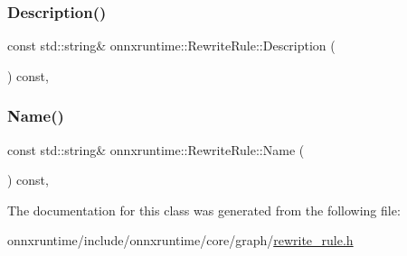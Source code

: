 \mbox{\label{classonnxruntime_1_1RewriteRule_aafea189c5808aa548e21b59650406357}} 
\subsubsection{\texorpdfstring{Description()}{Description()}}
{\footnotesize\ttfamily const std\+::string\& onnxruntime\+::\+Rewrite\+Rule\+::\+Description (\begin{DoxyParamCaption}{ }\end{DoxyParamCaption}) const\hspace{0.3cm}{\ttfamily [inline]}, {\ttfamily [noexcept]}}

\mbox{\label{classonnxruntime_1_1RewriteRule_a64f78e1ac1ffefb29f37e66f892dcc40}} 
\subsubsection{\texorpdfstring{Name()}{Name()}}
{\footnotesize\ttfamily const std\+::string\& onnxruntime\+::\+Rewrite\+Rule\+::\+Name (\begin{DoxyParamCaption}{ }\end{DoxyParamCaption}) const\hspace{0.3cm}{\ttfamily [inline]}, {\ttfamily [noexcept]}}



The documentation for this class was generated from the following file\+:\begin{DoxyCompactItemize}
\item 
onnxruntime/include/onnxruntime/core/graph/\mbox{\hyperlink{rewrite__rule_8h}{rewrite\+\_\+rule.\+h}}\end{DoxyCompactItemize}
